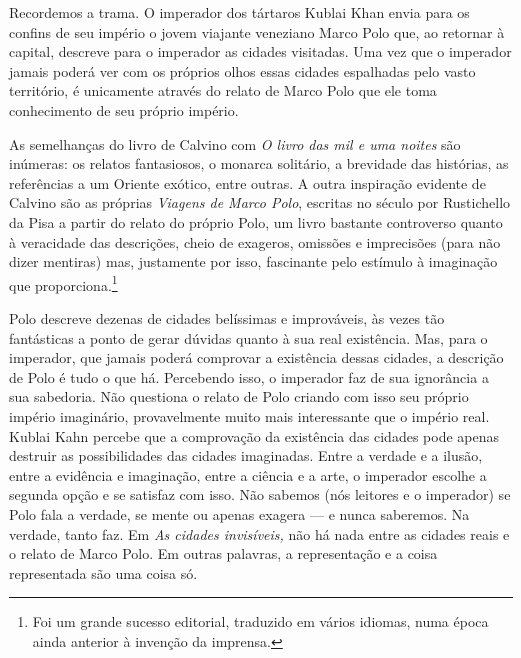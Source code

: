 Recordemos a trama. O imperador dos tártaros Kublai Khan envia para os
confins de seu império o jovem viajante veneziano Marco Polo que, ao
retornar à capital, descreve para o imperador as cidades visitadas. Uma
vez que o imperador jamais poderá ver com os próprios olhos essas
cidades espalhadas pelo vasto território, é unicamente através do relato
de Marco Polo que ele toma conhecimento de seu próprio império.

As semelhanças do livro de Calvino com \emph{O livro das mil e uma
noites} são inúmeras: os relatos fantasiosos, o monarca solitário, a
brevidade das histórias, as referências a um Oriente exótico, entre
outras. A outra inspiração evidente de Calvino são as próprias
\emph{Viagens de Marco Polo}, escritas no século  por Rustichello da %
Pisa a partir do relato do próprio Polo, um livro bastante controverso
quanto à veracidade das descrições, cheio de exageros, omissões e
imprecisões (para não dizer mentiras) mas, justamente por isso,
fascinante pelo estímulo à imaginação que proporciona.\footnote{Foi um
  grande sucesso editorial, traduzido em vários idiomas, numa época
  ainda anterior à invenção da imprensa.}

Polo descreve dezenas de cidades belíssimas e improváveis, às vezes tão
fantásticas a ponto de gerar dúvidas quanto à sua real existência. Mas,
para o imperador, que jamais poderá comprovar a existência dessas
cidades, a descrição de Polo é tudo o que há. Percebendo isso, o
imperador faz de sua ignorância a sua sabedoria. Não questiona o relato
de Polo criando com isso seu próprio império imaginário, provavelmente
muito mais interessante que o império real. Kublai Kahn percebe que a
comprovação da existência das cidades pode apenas destruir as
possibilidades das cidades imaginadas. Entre a verdade e a ilusão, entre
a evidência e imaginação, entre a ciência e a arte, o imperador escolhe
a segunda opção e se satisfaz com isso. Não sabemos (nós leitores e o
imperador) se Polo fala a verdade, se mente ou apenas exagera --- e nunca
saberemos. Na verdade, tanto faz. Em \emph{As cidades invisíveis,} não
há nada entre as cidades reais e o relato de Marco Polo. Em outras
palavras, a representação e a coisa representada são uma coisa só.

